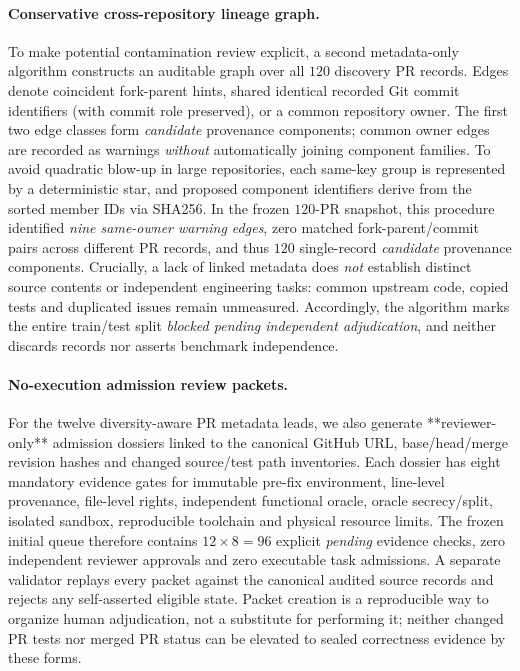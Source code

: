 \documentclass[pdflatex,sn-basic]{sn-jnl}
\begin{document}
\paragraph{Conservative cross-repository lineage graph.}
To make potential contamination review explicit, a
second metadata-only algorithm constructs an auditable
graph over all $120$ discovery PR records.
Edges denote coincident fork-parent hints,
shared identical recorded Git commit identifiers
(with commit role preserved), or a common repository
owner. The first two edge classes form
\emph{candidate} provenance components; common
owner edges are recorded as warnings \emph{without}
automatically joining component families.
To avoid quadratic blow-up in large repositories,
each same-key group is represented by a deterministic
star, and proposed component identifiers derive
from the sorted member IDs via SHA256.
In the frozen $120$-PR snapshot, this procedure
identified \emph{nine same-owner warning edges},
zero matched fork-parent/commit pairs across
different PR records, and thus $120$
single-record \emph{candidate} provenance components.
Crucially, a lack of linked metadata does
\emph{not} establish distinct source contents
or independent engineering tasks: common
upstream code, copied tests and duplicated
issues remain unmeasured. Accordingly,
the algorithm marks the entire train/test
split \emph{blocked pending independent
adjudication}, and neither discards records
nor asserts benchmark independence.

\paragraph{No-execution admission review packets.}
For the twelve diversity-aware PR metadata leads,
we also generate **reviewer-only** admission
dossiers linked to the canonical GitHub URL,
base/head/merge revision hashes and changed
source/test path inventories. Each dossier has
eight mandatory evidence gates for immutable
pre-fix environment, line-level provenance,
file-level rights, independent functional
oracle, oracle secrecy/split, isolated sandbox,
reproducible toolchain and physical resource
limits. The frozen initial queue therefore
contains $12\times 8=96$ explicit \emph{pending}
evidence checks, zero independent reviewer
approvals and zero executable task admissions.
A separate validator replays every packet
against the canonical audited source records
and rejects any self-asserted eligible state.
Packet creation is a reproducible way to
organize human adjudication, not a substitute
for performing it; neither changed PR tests
nor merged PR status can be elevated to
sealed correctness evidence by these forms.
\end{document}

